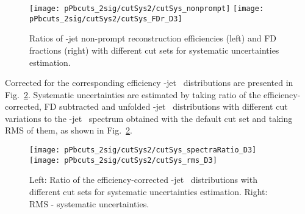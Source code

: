 \begin{figure}[bth]
\begin{center}
\texttt{[image: pPbcuts\_2sig/cutSys2/cutSys\_nonprompt]}
\texttt{[image: pPbcuts\_2sig/cutSys2/cutSys\_FDr\_D3]}
\caption{Ratios of \Dzero-jet non-prompt reconstruction efficiencies (left) and FD fractions (right) with different cut sets for systematic uncertainties estimation.} 
\label{fig:JetcutVarFD_Dzero}
\end{center}
\end{figure} 

Corrected for the corresponding efficiency \Dzero-jet \ptchjet\ distributions are presented in Fig.~\ref{fig:JetPtSys_Dzero}. Systematic uncertainties are estimated by taking ratio of the efficiency-corrected, FD subtracted and unfolded \Dzero-jet \ptchjet\ distributions with different cut variations to the \Dzero-jet \pt\ spectrum obtained with the default cut set and taking RMS of them, as shown in Fig.~\ref{fig:JetPtSys_Dzero}.


\begin{figure}[bth]
\begin{center}
\texttt{[image: pPbcuts\_2sig/cutSys2/cutSys\_spectraRatio\_D3]}
\texttt{[image: pPbcuts\_2sig/cutSys2/cutSys\_rms\_D3]}
\caption{Left: Ratio of the efficiency-corrected \Dzero-jet \pt\ distributions with different cut sets for systematic uncertainties estimation. Right: RMS - systematic uncertainties.} 
\label{fig:JetPtSys_Dzero}
\end{center}
\end{figure}

%

